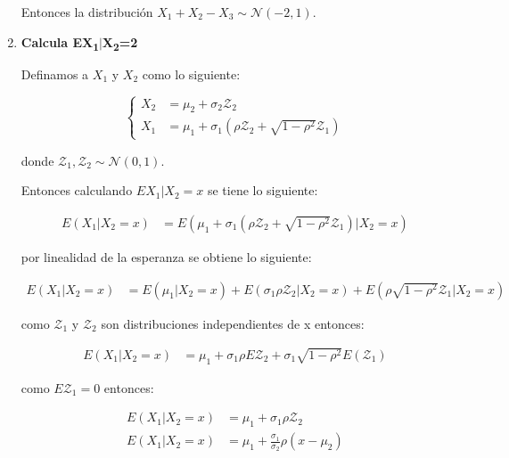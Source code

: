 \begin{enumerate}
          Entonces la distribución $X_1+X_2-X_3 \sim \mathcal{N}(-2,1)$.

    \item \textbf{Calcula EX\textsubscript{1}$|$X\textsubscript{2}=2}

          Definamos a $X_1$ y $X_2$ como lo siguiente:

          \begin{equation*}
              \begin{cases}
                  X_2 & = \mu_2 + \sigma_2 \mathcal{Z}_2                                                      \\
                  X_1 & = \mu_1 + \sigma_1 \left ( \rho \mathcal{Z}_2  + \sqrt{1-\rho^2}\mathcal{Z}_1\right )
              \end{cases}
          \end{equation*}

          donde $\mathcal{Z}_1 , \mathcal{Z}_2 \sim \mathcal{N}(0,1)$.

          Entonces calculando $EX_1|X_2=x$ se tiene lo siguiente:

          \begin{align*}
              E(X_1 | X_2=x) & = E(\mu_1 + \sigma_1 \left ( \rho \mathcal{Z}_2  + \sqrt{1-\rho^2}\mathcal{Z}_1\right )|X_2=x)
          \end{align*}

          por linealidad de la esperanza se obtiene lo siguiente:

          \begin{align*}
              E(X_1 | X_2=x) & =E(\mu_1|X_2=x) + E(\sigma_1 \rho \mathcal{Z}_2|X_2=x) + E(\rho \sqrt{1-\rho^2}\mathcal{Z}_1|X_2=x)
          \end{align*}

          como $\mathcal{Z}_1$ y $\mathcal{Z}_2$ son distribuciones independientes de x entonces:

          \begin{align*}
              E(X_1 | X_2=x) & =\mu_1 + \sigma_1 \rho E\mathcal{Z}_2 + \sigma_1 \sqrt{1-\rho^2}E(\mathcal{Z}_1)
          \end{align*}

          como $E\mathcal{Z}_1=0$ entonces:

          \begin{align*}
              E(X_1 | X_2=x) & =\mu_1 + \sigma_1 \rho \mathcal{Z}_2               \\
              E(X_1 | X_2=x) & = \mu_1 + \frac{\sigma_1}{\sigma_2} \rho (x-\mu_2)
          \end{align*}


\end{enumerate}

